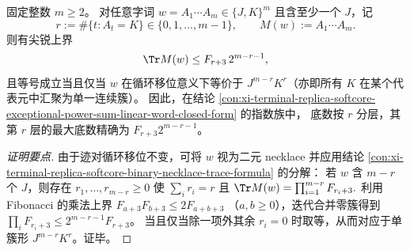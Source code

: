 \begin{conclusion}\label{con:xi-terminal-replica-softcore-fixed-zero-count-trace-extremal}
固定整数 \(m\ge 2\)。
对任意字词 \(w=A_1\cdots A_m\in\{J,K\}^m\) 且含至少一个 \(J\)，记
\[
r:=\#\{t:A_t=K\}\in\{0,1,\dots,m-1\},
\qquad
M(w):=A_1\cdots A_m.
\]
则有尖锐上界
\[
\Tr M(w)\le F_{r+3}\,2^{m-r-1},
\]
且等号成立当且仅当 \(w\) 在循环移位意义下等价于 \(J^{m-r}K^{r}\)（亦即所有 \(K\) 在某个代表元中汇聚为单一连续簇）。
因此，在结论 \ref{con:xi-terminal-replica-softcore-exceptional-power-sum-linear-word-closed-form} 的指数族中，
底数按 \(r\) 分层，其第 \(r\) 层的最大底数精确为 \(F_{r+3}2^{m-r-1}\)。
\end{conclusion}
\begin{proof}[证明要点]
由于迹对循环移位不变，可将 \(w\) 视为二元 necklace 并应用结论 \ref{con:xi-terminal-replica-softcore-binary-necklace-trace-formula} 的分解：
若 \(w\) 含 \(m-r\) 个 \(J\)，则存在 \(r_1,\dots,r_{m-r}\ge 0\) 使 \(\sum_i r_i=r\) 且
\(
\Tr M(w)=\prod_{i=1}^{m-r}F_{r_i+3}.
\)
利用 Fibonacci 的乘法上界
\(
F_{a+3}F_{b+3}\le 2F_{a+b+3}
\)
（\(a,b\ge 0\)），迭代合并零簇得到
\(
\prod_{i}F_{r_i+3}\le 2^{m-r-1}F_{r+3}
\)。
当且仅当除一项外其余 \(r_i=0\) 时取等，从而对应于单簇形 \(J^{m-r}K^{r}\)。证毕。
\end{proof}
\endinput
